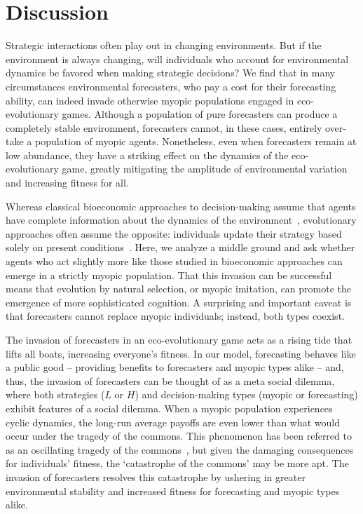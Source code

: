 \documentclass{article}
\begin{document}
\section*{Discussion}
Strategic interactions often play out in changing environments.
But if the environment is always changing, will individuals who account for environmental dynamics be favored when making strategic decisions? We find that in many circumstances environmental forecasters, who pay a cost for their forecasting ability,  can indeed invade otherwise myopic populations engaged in eco-evolutionary games. Although a population of pure forecasters can produce a completely stable environment, forecasters cannot, in these cases, entirely over-take a population of myopic agents. Nonetheless, even when forecasters remain at low abundance, they have a striking effect on the dynamics of the eco-evolutionary game, greatly mitigating the amplitude of environmental variation and increasing fitness for all. 

Whereas classical bioeconomic approaches to decision-making assume that agents have complete information about the dynamics of the environment~\citep{clark}, evolutionary approaches often assume the opposite: individuals update their strategy based solely on present conditions~\citep{safarzynska2010}. Here, we analyze a middle ground and ask whether agents who act slightly more like those studied in bioeconomic approaches can emerge in a strictly myopic population. That this invasion can be successful means that evolution by natural selection, or myopic imitation, can promote the emergence of more sophisticated cognition. A surprising and important caveat is that forecasters cannot replace myopic individuals; instead, both types coexist. 

The invasion of forecasters in an eco-evolutionary game acts as a rising tide that lifts all boats, increasing everyone's fitness. In our model, forecasting behaves like a public good -- providing benefits to forecasters and myopic types alike -- and, thus, the invasion of forecasters can be thought of as a meta social dilemma, where both strategies ($L$ or $H$) and decision-making types (myopic or forecasting) exhibit features of a social dilemma. When a myopic population experiences cyclic dynamics, the long-run average payoffs are even lower than what would occur under the tragedy of the commons. This phenomenon has been referred to as an oscillating tragedy of the commons~\citep{weitz}, but given the damaging consequences for individuals' fitness, the `catastrophe of the commons' may be more apt. The invasion of forecasters resolves this catastrophe by ushering in greater environmental stability and increased fitness for forecasting and myopic types alike. 
\end{document}
